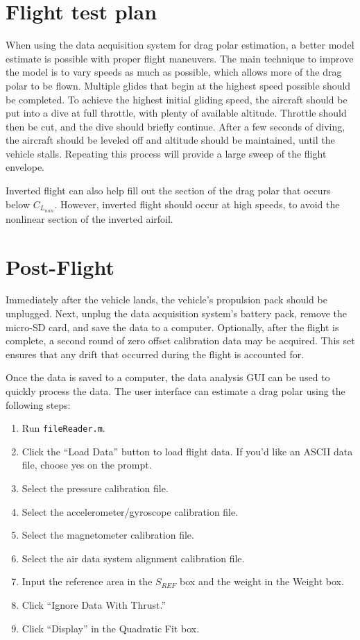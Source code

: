 \section{Flight test plan}
When using the data acquisition system for drag polar estimation, a better model estimate is possible with proper flight maneuvers. The main technique to improve the model is to vary speeds as much as possible, which allows more of the drag polar to be flown. Multiple glides that begin at the highest speed possible should be completed. To achieve the highest initial gliding speed, the aircraft should be put into a dive at full throttle, with plenty of available altitude. Throttle should then be cut, and the dive should briefly continue. After a few seconds of diving, the aircraft should be leveled off and altitude should be maintained, until the vehicle stalls. Repeating this process will provide a large sweep of the flight envelope.

Inverted flight can also help fill out the section of the drag polar that occurs below $C_{L_{min}}$. However, inverted flight should occur at high speeds, to avoid the nonlinear section of the inverted airfoil.

\section{Post-Flight}
Immediately after the vehicle lands, the vehicle's propulsion pack should be unplugged. Next, unplug the data acquisition system's battery pack, remove the micro-SD card, and save the data to a computer. Optionally, after the flight is complete, a second round of zero offset calibration data may be acquired. This set ensures that any drift that occurred during the flight is accounted for.

Once the data is saved to a computer, the data analysis GUI can be used to quickly process the data.  The user interface can estimate a drag polar using the following steps:
\begin{enumerate}
\item Run \texttt{fileReader.m}.
\item Click the ``Load Data'' button to load flight data. If you'd like an ASCII data file, choose yes on the prompt.
\item Select the pressure calibration file.
\item Select the accelerometer/gyroscope calibration file.
\item Select the magnetometer calibration file.
\item Select the air data system alignment calibration file.
\item Input the reference area in the $S_{REF}$ box and the weight in the Weight box.
\item Click ``Ignore Data With Thrust.''
\item Click ``Display'' in the Quadratic Fit box.
\end{enumerate}


